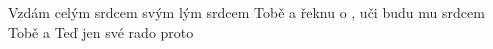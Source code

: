 \begin{TEXT}{Vzdám celým srdcem svým}
\SLOKA {} lým srdcem  Tobě  a \NL
řeknu  o ,  uči\NL
budu  mu \NL
{}  srdcem  Tobě  a   \NL
Teď  jen   své rado  \NL
proto 
\end{TEXT}
